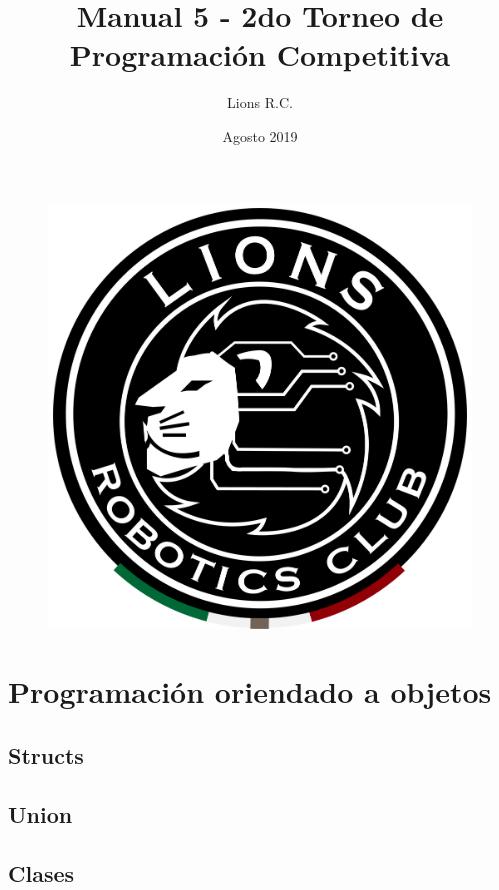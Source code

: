 \documentclass{article}
\title{Manual 5 - 2do Torneo de Programación Competitiva}
\author{Lions R.C.}
\date{Agosto 2019}
\begin{document}
\maketitle

\tableofcontents

\begin{figure}[H]
    \centering
    \includegraphics[width=0.2\paperwidth]{newblack}
\end{figure}

\section{Programación oriendado a objetos}

\subsection{Structs}

\subsection{Union}

\subsection{Clases}
\end{document}
